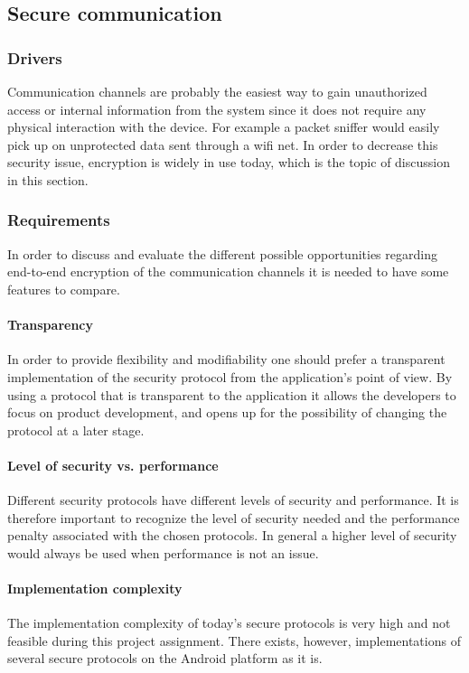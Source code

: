 \subsection{Secure communication}

\subsubsection{Drivers}
Communication channels are probably the easiest way to gain unauthorized access or internal information from the system since it does not require any physical interaction with the device.  For example a packet sniffer would easily pick up on unprotected data sent through a wifi net. In order to decrease this security issue, encryption is widely in use today, which is the topic of discussion in this section.

\subsubsection{Requirements}
In order to discuss and evaluate the different possible opportunities regarding end-to-end encryption of the communication channels it is needed to have some features to compare.

\paragraph{Transparency}
In order to provide flexibility and modifiability one should prefer a transparent implementation of the security protocol from the application’s point of view. By using a protocol that is transparent to the application it allows the developers to focus on product development, and opens up for the possibility of changing the protocol at a later stage.

\paragraph{Level of security vs. performance}
Different security protocols have different levels of security and performance. It is therefore important to recognize the level of security needed and the performance penalty associated with the chosen protocols. In general a higher level of security would always be used when performance is not an issue.

\paragraph{Implementation complexity}
The implementation complexity of today's secure protocols is very high and not feasible during this project assignment. There exists, however, implementations of several secure protocols on the Android platform as it is. 

